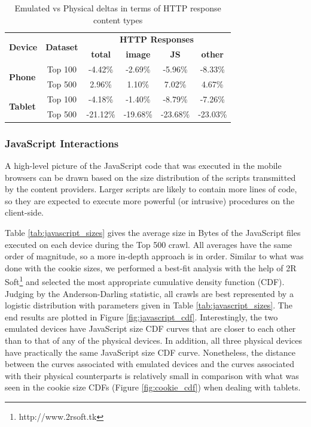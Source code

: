 \documentclass{acm_proc_article-sp}
\begin{document}
\begin{table}[htbp]
  \centering
  \caption{Emulated vs Physical deltas in terms of HTTP response content types}
    \begin{tabular}{|c|c|c|c|c|c|}
    \hline
    \multicolumn{1}{|c|}{\multirow{2}[4]{*}{\textbf{Device}}} & \multicolumn{1}{|c|}{\multirow{2}[4]{*}{\textbf{Dataset}}} & \multicolumn{4}{|c|}{\textbf{HTTP Responses}} \\ \cline{3-6}
    \multicolumn{1}{|c|}{} & \multicolumn{1}{|c|}{} & \multicolumn{1}{|c|}{\textbf{total}} & \multicolumn{1}{|c|}{\textbf{image}} & \multicolumn{1}{|c|}{\textbf{JS}} & \multicolumn{1}{|c|}{\textbf{other}} \\ \hline
    \multicolumn{1}{|l|}{\multirow{2}[4]{*}{\textbf{Phone}}} & Top 100 & -4.42\% & -2.69\% & -5.96\% & -8.33\% \\
    \multicolumn{1}{|l|}{} & Top 500 & 2.96\% & 1.10\% & 7.02\% & 4.67\% \\ \hline
    \multicolumn{1}{|l|}{\multirow{2}[4]{*}{\textbf{Tablet}}} & Top 100 & -4.18\% & -1.40\% & -8.79\% & -7.26\% \\
    \multicolumn{1}{|l|}{} & Top 500 & -21.12\% & -19.68\% & -23.68\% & -23.03\% \\ \hline
    \end{tabular}%
  \label{tab:http_diffs}%
\end{table}%

\subsubsection{JavaScript Interactions}

A high-level picture of the JavaScript code that was executed in the mobile browsers can be drawn based on the size distribution of the scripts transmitted by the content providers. Larger scripts are likely to contain more lines of code, so they are expected to execute more powerful (or intrusive) procedures on the client-side.

Table \ref{tab:javascript_sizes} gives the average size in Bytes of the JavaScript files executed on each device during the Top 500 crawl. All averages have the same order of magnitude, so a more in-depth approach is in order.  Similar to what was done with the cookie sizes, we performed a best-fit analysis with the help of 2R Soft\footnote{http://www.2rsoft.tk} and selected the most appropriate cumulative density function (CDF). Judging by the Anderson-Darling statistic, all crawls are best represented by a logistic distribution with parameters given in Table \ref{tab:javascript_sizes}. The end results are plotted in Figure \ref{fig:javascript_cdf}. Interestingly, the two emulated devices have JavaScript size CDF curves that are closer to each other than to that of any of the physical devices. In addition, all three physical devices have practically the same JavaScript size CDF curve. Nonetheless, the distance between the curves associated with emulated devices and the curves associated with their physical counterparts is relatively small in comparison with what was seen in the cookie size CDFs (Figure \ref{fig:cookie_cdf}) when dealing with tablets.
\end{document}
